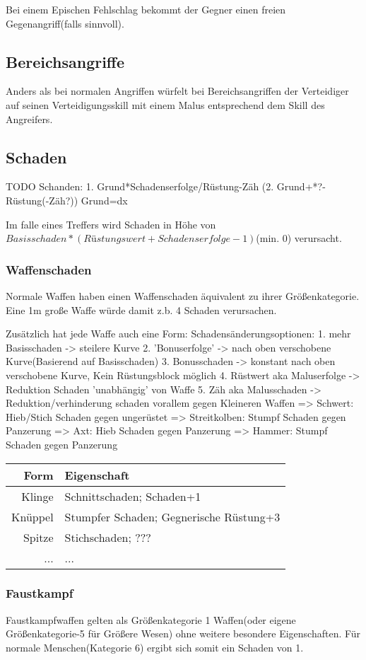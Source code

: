 Bei einem Epischen Fehlschlag bekommt der Gegner einen freien Gegenangriff(falls sinnvoll).

\subsection{Bereichsangriffe}
Anders als bei normalen Angriffen würfelt bei Bereichsangriffen der Verteidiger auf seinen Verteidigungsskill mit einem Malus entsprechend dem Skill des Angreifers.

\subsection{Schaden}
TODO Schanden: 
1. Grund*Schadenserfolge/Rüstung-Zäh
(2. Grund+*?-Rüstung(-Zäh?))
Grund=dx

Im falle eines Treffers wird Schaden in Höhe von $Basisschaden*(Rüstungswert+Schadenserfolge-1)$(min. 0) verursacht.
\subsubsection{Waffenschaden}
Normale Waffen haben einen Waffenschaden äquivalent zu ihrer Größenkategorie. Eine 1m große Waffe würde damit z.b. 4 Schaden verursachen. 

Zusätzlich hat jede Waffe auch eine Form:
Schadensänderungsoptionen:
	1. mehr Basisschaden -> steilere Kurve
	2. 'Bonuserfolge' -> nach oben verschobene Kurve(Basierend auf Basisschaden)
	3. Bonusschaden -> konstant nach oben verschobene Kurve, Kein Rüstungsblock möglich
	4. Rüstwert aka Maluserfolge -> Reduktion Schaden 'unabhängig' von Waffe
	5. Zäh aka Malusschaden -> Reduktion/verhinderung schaden vorallem gegen Kleineren Waffen
=> Schwert: Hieb/Stich Schaden gegen ungerüstet
=> Streitkolben: Stumpf Schaden gegen Panzerung
=> Axt: Hieb Schaden gegen Panzerung
=> Hammer: Stumpf Schaden gegen Panzerung
\begin{tabular}{|r|l|}
\hline Form & Eigenschaft\\
\hline Klinge & Schnittschaden; Schaden+1\\
\hline Knüppel & Stumpfer Schaden; Gegnerische Rüstung+3\\
\hline Spitze & Stichschaden; ???\\
\hline ... & ...\\
\hline
\end{tabular}
\subsubsection{Faustkampf}
Faustkampfwaffen gelten als Größenkategorie 1 Waffen(oder eigene Größenkategorie-5 für Größere Wesen) ohne weitere besondere Eigenschaften. Für normale Menschen(Kategorie 6) ergibt sich somit ein Schaden von 1.


